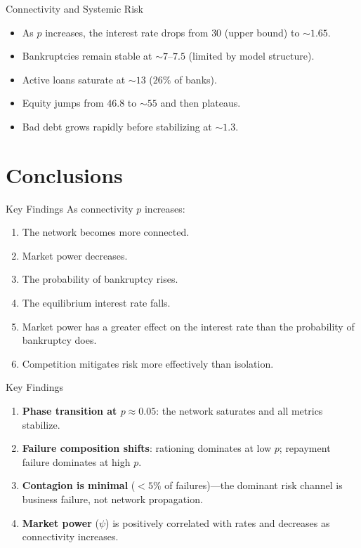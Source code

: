 \begin{frame}{Connectivity and Systemic Risk}
  \begin{itemize}
    \item As $p$ increases, the interest rate drops from $30$ (upper bound) to $\sim 1.65$.
    \item Bankruptcies remain stable at $\sim 7$--$7.5$ (limited by model structure).
    \item Active loans saturate at $\sim 13$ ($26\%$ of banks).
    \item Equity jumps from $46.8$ to $\sim 55$ and then plateaus.
    \item Bad debt grows rapidly before stabilizing at $\sim 1.3$.
  \end{itemize}
\end{frame}


\section{Conclusions}\label{sec:7}

\begin{frame}{Key Findings}
  As connectivity $p$ increases:
  \begin{enumerate}
    \item The network becomes more connected.
    \item Market power decreases.
    \item The probability of bankruptcy rises.
    \item The equilibrium interest rate falls.
    \item Market power has a greater effect on the interest rate than the probability of bankruptcy does.
    \item Competition mitigates risk more effectively than isolation.
  \end{enumerate}
\end{frame}



\begin{frame}{Key Findings}
  \begin{enumerate}
    \item \textbf{Phase transition at $p \approx 0.05$}: the network saturates and all metrics stabilize.
    \item \textbf{Failure composition shifts}: rationing dominates at low $p$; repayment failure dominates at high $p$.
    \item \textbf{Contagion is minimal} ($<5\%$ of failures)---the dominant risk channel is business failure, not network propagation.
    \item \textbf{Market power} ($\psi$) is positively correlated with rates and decreases as connectivity increases.
  \end{enumerate}
\end{frame}

